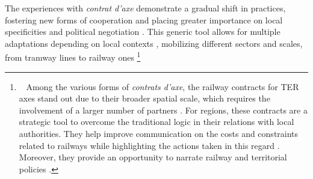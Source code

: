 \begin{refsegment}
The experiences with \textsl{contrat d’axe} demonstrate a gradual  shift in practices, fostering new forms of cooperation and placing greater importance on local specificities and political negotiation \textcolor{blue}{\autocite[96]{maulat_contractualiser_2015}}. This generic tool allows for multiple adaptations depending on local contexts \textcolor{blue}{\autocite[457, 468]{maulat_coordonner_2014}}, mobilizing different sectors and scales, from tramway lines to railway ones \footnote{~
    Among the various forms of \textsl{contrats d’axe}, the railway contracts for \acrshort{TER} axes stand out due to their broader spatial scale, which requires the involvement of a larger number of partners \textcolor{blue}{\autocite[51]{cerema_articuler_2015}}. For regions, these contracts are a strategic tool to overcome the traditional  logic in their relations with local authorities. They help improve communication on the costs and constraints related to railways while highlighting the actions taken in this regard \textcolor{blue}{\autocite[53]{cerema_articuler_2015}}. Moreover, they provide an opportunity to narrate railway and territorial policies \textcolor{blue}{\autocite{fandio_contrat_2023}}.
}
\end{refsegment}
